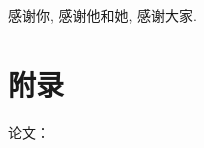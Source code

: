 

\acknowledgement


感谢你, 感谢他和她, 感谢大家.


  \iflib
  \else
  \newpage
  \cleardoublepage
  \fi

\chapter{附录}
论文：





